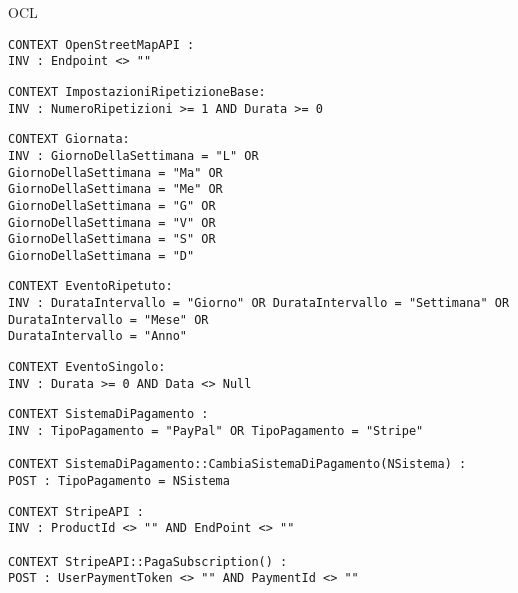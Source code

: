 \begin{listaPersonale}{OCL}
    \begin{lstlisting}
CONTEXT OpenStreetMapAPI :
INV : Endpoint <> ""
    \end{lstlisting}




    \begin{lstlisting}
CONTEXT ImpostazioniRipetizioneBase:
INV : NumeroRipetizioni >= 1 AND Durata >= 0
    \end{lstlisting}




    \begin{lstlisting}
CONTEXT Giornata:
INV : GiornoDellaSettimana = "L" OR
GiornoDellaSettimana = "Ma" OR
GiornoDellaSettimana = "Me" OR
GiornoDellaSettimana = "G" OR
GiornoDellaSettimana = "V" OR
GiornoDellaSettimana = "S" OR
GiornoDellaSettimana = "D"
    \end{lstlisting}




    \begin{lstlisting}
CONTEXT EventoRipetuto:
INV : DurataIntervallo = "Giorno" OR DurataIntervallo = "Settimana" OR DurataIntervallo = "Mese" OR 
DurataIntervallo = "Anno"
    \end{lstlisting}




    \begin{lstlisting}
CONTEXT EventoSingolo:
INV : Durata >= 0 AND Data <> Null
    \end{lstlisting}




    \begin{lstlisting}
CONTEXT SistemaDiPagamento :
INV : TipoPagamento = "PayPal" OR TipoPagamento = "Stripe"

CONTEXT SistemaDiPagamento::CambiaSistemaDiPagamento(NSistema) :
POST : TipoPagamento = NSistema
    \end{lstlisting}




    \begin{lstlisting}
CONTEXT StripeAPI :
INV : ProductId <> "" AND EndPoint <> ""

CONTEXT StripeAPI::PagaSubscription() :
POST : UserPaymentToken <> "" AND PaymentId <> ""
    \end{lstlisting}





\end{listaPersonale}
